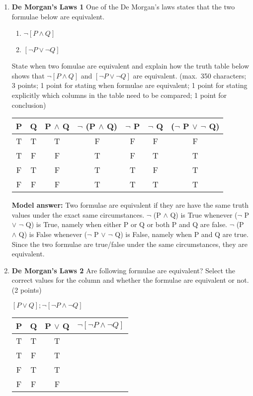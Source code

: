 \documentclass[a4,11pt]{article}
\newcommand{\6}{\mbox{$[\hspace*{-.6mm}[$}}
\newcommand{\9}{\mbox{$]\hspace*{-.6mm}]$}}
\begin{document}
\begin{enumerate}[leftmargin = 12pt]
\item {\bf De Morgan's Laws 1} One of the De Morgan's laws states that the two formulae below are equivalent. 

\begin{enumerate}
\item  $\neg [ P \land  Q ]$
\item  $ [ \neg P \lor \neg Q ]$
\end{enumerate}

State when two fomulae are equivalent and explain how the truth table below shows that  $\neg [ P \land  Q ]$
and $ [ \neg P \lor \neg Q ]$ are equivalent. (max.\ 350 characters; 3 points; 1 point for stating when formulae are equivalent; 1 point for stating explicitly which columns in the table need to be compared; 1 point for conclusion)

\begin{tabular}{c | c | c | c | c | c | c}
\hline \hline
P & Q & P $\land$ Q & $\neg$ (P $\land$ Q) & $\neg$ P & $\neg$ Q & ($\neg$ P $\lor$ $\neg$ Q) \\
\hline \hline
T & T & T  & F & F & F & F\\
T & F & F & T & F & T & T\\
F & T & F& T & T & F & T\\
F & F & F& T& T & T & T\\
\hline \hline


\end{tabular}

{ \bf Model answer:} Two formulae are equivalent if they are have the same truth values under the exact same circumstances. $\neg$ (P $\land$ Q) is True whenever ($\neg$ P $\lor$ $\neg$ Q) is True, namely when either P or Q or both P and Q are false. $\neg$ (P $\land$ Q) is False whenever  ($\neg$ P $\lor$ $\neg$ Q) is False, namely when P and Q are true. Since the two formulae are true/false under the same circumstances, they are equivalent.




\item {\bf De Morgan's Laws 2} Are following formulae are equivalent? Select the correct values for the column and whether the formulae are equivalent or not. (2 points)

 $[P \lor Q]; \neg [ \neg P \land \neg Q]$


\begin{tabular}{c | c | c | c }
\hline \hline
P & Q & P $\lor$ Q & $\neg [ \neg P \land \neg Q]$ \\
\hline \hline
T & T & T \\
T & F & T \\
F & T & T \\
F & F & F \\
\hline \hline
\end{tabular}


\end{enumerate}
\end{document}
